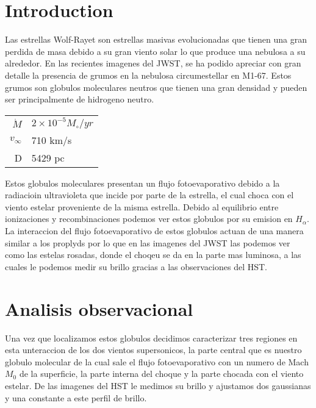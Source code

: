 \documentclass[twocolumn, times]{aastex631}
\begin{document}


\section{Introduction}
\label{sec:introduction}

Las estrellas Wolf-Rayet son estrellas masivas evolucionadas que tienen una gran perdida de masa debido a su gran viento solar lo que produce una nebulosa a su alrededor. En las recientes imagenes del JWST, se ha podido apreciar con gran detalle la presencia de grumos en la nebulosa circumestellar en M1-67. Estos grumos son globulos moleculares neutros que tienen una gran densidad y pueden ser principalmente de hidrogeno neutro. 

\begin{center}
\begin{tabular}{r l}

$\dot{M}$ & $2\times10^{-5}M_\circ/yr$ \\
$v_\infty$ & 710 km/s \\
D & 5429 pc

\end{tabular} 
\end{center}

Estos globulos moleculares presentan un flujo fotoevaporativo debido a la radiacioin ultravioleta que incide por parte de la estrella, el cual choca con el viento estelar proveniente de la misma estrella. Debido al equilibrio entre ionizaciones y recombinaciones podemos ver estos globulos por su emision en $H_\alpha$. La interaccion del flujo fotoevaporativo de estos globulos actuan de una manera similar a los proplyds por lo  que en las imagenes del JWST las podemos ver como  las estelas rosadas, donde el choqeu se da en la parte mas luminosa, a las cuales le podemos medir su brillo gracias a las observaciones del HST.

\section{Analisis observacional}
\label{sec:analisis}

Una vez que localizamos estos globulos decidimos caracterizar tres regiones en esta unteraccion de los dos vientos supersonicos, la parte central que es nuestro globulo molecular de la cual sale el flujo fotoevaporativo con un numero de Mach $M_0$ de la superficie, la parte interna del choque y la parte chocada con el viento estelar. De las imagenes del HST le medimos su brillo y ajustamos dos gaussianas y una constante a este perfil de brillo.
\end{document}
